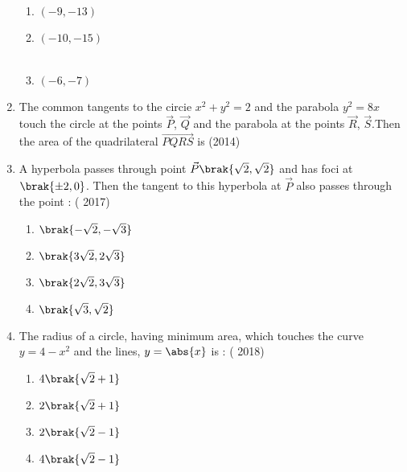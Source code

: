 \begin{enumerate}
\begin{multicols}{2}
\begin{enumerate}
    \item${(-9,-13)}$
    \item${(-10,-15)}$\\\\
    \item${(-6,-7)}$
\end{enumerate}
\end{multicols}
	\item The common tangents to the circie $x^2+y^2=2$ and the parabola $y^2=8x$ touch the circle at the points $\vec{P}$, $\vec{Q}$ and the parabola at the points $\vec{R}$, $\vec{S}$.Then the area of the quadrilateral $\vec{PQRS}$ is \hfill(2014)
		\begin{multicols}{2}
\begin{enumerate}
		\end{enumerate}
\end{multicols}
\item A hyperbola passes through point $\vec{P}\brak{\sqrt2,\sqrt2}$  and  has  foci  at $\brak{\pm2,0}$. Then  the  tangent  to  this  hyperbola at $\vec{P}$ also passes through the point :
      \hfill{( 2017)} 
	\begin{multicols}{2}
\begin{enumerate}
    		\item  $\brak{-\sqrt2,-\sqrt3}$
    		\item  $\brak{3\sqrt2,2\sqrt3}$
    		\item  $\brak{2\sqrt2,3\sqrt3}$
    		\item  $\brak{\sqrt3,\sqrt2}$
	\end{enumerate}
\end{multicols}
\item  The radius of a circle, having minimum area, which touches the curve $y=4-x^2$ and the lines, $y=\abs{x}$ is : 
   \hfill{( 2018)}
	\begin{multicols}{2}
\begin{enumerate}
     		\item $4\brak{\sqrt2+1}$
     		\item $2\brak{\sqrt2+1}$
     		\item $2\brak{\sqrt2-1}$
     		\item $4\brak{\sqrt2-1}$

\end{enumerate}
\end{multicols}
\end{enumerate}
